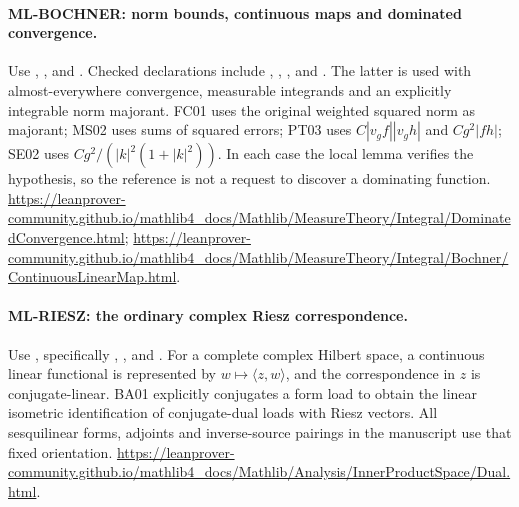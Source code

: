 \documentclass[11pt,a4paper]{article}
\theoremstyle{remark}\newtheorem{remark}[theorem]{Remark}
\begin{document}
\hypertarget{leaf:ML-BOCHNER}{}\paragraph{ML-BOCHNER: norm bounds, continuous maps and dominated convergence.}
Use ,
, and
. Checked declarations include
,
,
, and
.
The latter is used with almost-everywhere convergence, measurable integrands and an explicitly integrable norm majorant. FC01 uses the original weighted squared norm as majorant; MS02 uses sums of squared errors; PT03 uses $C|v_gf||v_gh|$ and $Cg^2|fh|$; SE02 uses $Cg^2/(|k|^2(1+|k|^2))$. In each case the local lemma verifies the hypothesis, so the reference is not a request to discover a dominating function.
\url{https://leanprover-community.github.io/mathlib4_docs/Mathlib/MeasureTheory/Integral/DominatedConvergence.html};
\url{https://leanprover-community.github.io/mathlib4_docs/Mathlib/MeasureTheory/Integral/Bochner/ContinuousLinearMap.html}.

\hypertarget{leaf:ML-RIESZ}{}\paragraph{ML-RIESZ: the ordinary complex Riesz correspondence.}
Use , specifically
,
, and
.
For a complete complex Hilbert space, a continuous linear functional is represented by $w\mapsto\langle z,w\rangle$, and the correspondence in $z$ is conjugate-linear. BA01 explicitly conjugates a form load to obtain the linear isometric identification of conjugate-dual loads with Riesz vectors. All sesquilinear forms, adjoints and inverse-source pairings in the manuscript use that fixed orientation.
\url{https://leanprover-community.github.io/mathlib4_docs/Mathlib/Analysis/InnerProductSpace/Dual.html}.
\end{document}
